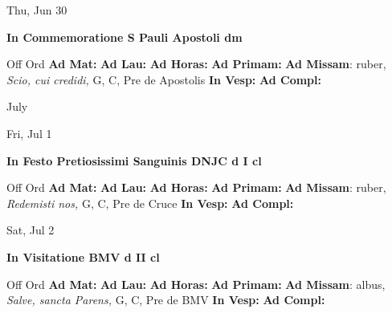 \documentclass[10pt]{memoir}
\begin{document}
\begin{center}
\begin{minipage}{3.5in}
\vspace{2em}
\begin{center}Thu, Jun 30
\end{center}
\textbf{ \large In Commemoratione S Pauli Apostoli
\textnormal{\normalsize dm}}

\begin{justify}Off Ord
\textbf{Ad Mat: }
\textbf{Ad Lau: }
\textbf{Ad Horas: }
\textbf{Ad Primam: }\textbf{Ad Missam}: ruber, \textit{Scio, cui credidi,} G, C, Pre de Apostolis
\textbf{In Vesp: }
\textbf{Ad Compl: }
\end{justify}
\end{minipage}
\end{center}

\begin{center}
\pagebreak
\thispagestyle{empty}
{\Huge July}
\end{center}
                    
\begin{center}
\begin{minipage}{3.5in}
\vspace{2em}
\begin{center}Fri, Jul 1
\end{center}
\textbf{ \large In Festo Pretiosissimi Sanguinis DNJC
\textnormal{\normalsize d I cl}}

\begin{justify}Off Ord
\textbf{Ad Mat: }
\textbf{Ad Lau: }
\textbf{Ad Horas: }
\textbf{Ad Primam: }\textbf{Ad Missam}: ruber, \textit{Redemisti nos,} G, C, Pre de Cruce
\textbf{In Vesp: }
\textbf{Ad Compl: }
\end{justify}
\end{minipage}
\end{center}

\begin{center}
\begin{minipage}{3.5in}
\vspace{2em}
\begin{center}Sat, Jul 2
\end{center}
\textbf{ \large In Visitatione BMV
\textnormal{\normalsize d II cl}}

\begin{justify}Off Ord
\textbf{Ad Mat: }
\textbf{Ad Lau: }
\textbf{Ad Horas: }
\textbf{Ad Primam: }\textbf{Ad Missam}: albus, \textit{Salve, sancta Parens,} G, C, Pre de BMV
\textbf{In Vesp: }
\textbf{Ad Compl: }
\end{justify}
\end{minipage}
\end{center}
\end{document}
